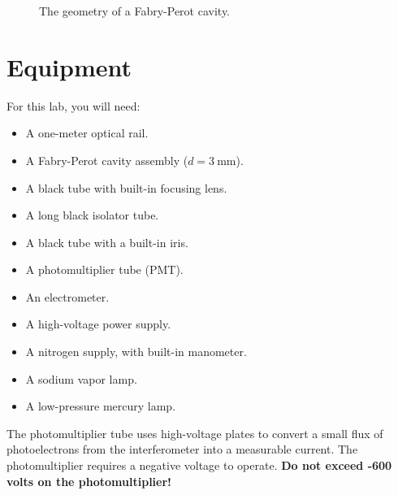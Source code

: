 \documentclass[]{manual}
\begin{document}
\begin{figure}

        \caption{The geometry of a Fabry-Perot cavity.}

        \label{fig:fabry-perot-geometry}
    \end{figure}

    \section{Equipment}

    For this lab, you will need:
    \begin{itemize}
        \item A one-meter optical rail.
        \item A Fabry-Perot cavity assembly ($d=\SI{3}{\milli\meter}$).
        \item A black tube with built-in focusing lens.
        \item A long black isolator tube.
        \item A black tube with a built-in iris.
        \item A photomultiplier tube (PMT).
        \item An electrometer.
        \item A high-voltage power supply.
        \item A nitrogen supply, with built-in manometer.
        \item A sodium vapor lamp.
        \item A low-pressure mercury lamp.
    \end{itemize}

    \noindent
    The photomultiplier tube uses high-voltage plates to convert a small flux of photoelectrons from the interferometer into a measurable current.
    The photomultiplier requires a negative voltage to operate.
    \textbf{Do not exceed -600 volts on the photomultiplier!}

    \FloatBarrier
    \newpage
\end{document}
